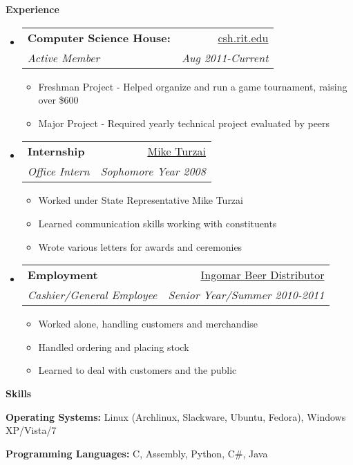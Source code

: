 \documentclass[letterpaper,11pt]{article}
\makeatletter
\newcommand{\resitem}[1]{\item #1 \vspace{-2pt}}
\newcommand{\resheading}[1]{{\large \colorbox{mygrey}{\begin{minipage}{\textwidth}{\textbf{#1 \vphantom{p\^{E}}}}\end{minipage}}}}
\newcommand{\ressubheading}[4]{
\begin{tabular*}{6.5in}{l@{\extracolsep{\fill}}r}
		\textbf{#1} & #2 \\
		\textit{#3} & \textit{#4} \\
\end{tabular*}\vspace{-6pt}}
\makeatother
\begin{document}
\resheading{Experience}
	\begin{itemize}
		\item 
			\ressubheading{Computer Science House:}{\href{http://www.csh.rit.edu/}{csh.rit.edu}}{Active Member}{Aug 2011-Current} 
			{ \footnotesize
				\begin{itemize}		
					\resitem{{Freshman Project} - Helped organize and run a game tournament, raising over \$600} 
					\resitem{{Major Project} - Required yearly technical project evaluated by peers}
				\end{itemize}
			}
		\item	
			\ressubheading{Internship}{\href{http://www.repturzai.com/}{Mike Turzai}}{Office Intern}{Sophomore Year 2008} 
				{ \footnotesize 
				\begin{itemize}
					\item{Worked under State Representative Mike Turzai}
					\item{Learned communication skills working with constituents}
					\item{Wrote various letters for awards and ceremonies}
				\end{itemize}
				}
		\item 
			\ressubheading{Employment}{\href{https://www.facebook.com/pages/Ingomar-Beer-Distributor/120207034680524}{Ingomar Beer Distributor}}{Cashier/General Employee}{Senior Year/Summer 2010-2011}
			{ \footnotesize
				\begin{itemize}
					\item{Worked alone, handling customers and merchandise}
					\item{Handled ordering and placing stock}
					\item{Learned to deal with customers and the public}
				\end{itemize}
			}
		
	\end{itemize}  %

\resheading{{Skills}}
	\begin{description}
		\item{\textbf{Operating Systems: }{Linux (Archlinux, Slackware, Ubuntu, Fedora), Windows XP/Vista/7}}
		\item{\textbf{Programming Languages: }{C, Assembly, Python, C\#, Java}}
	\end{description}
\end{document}
